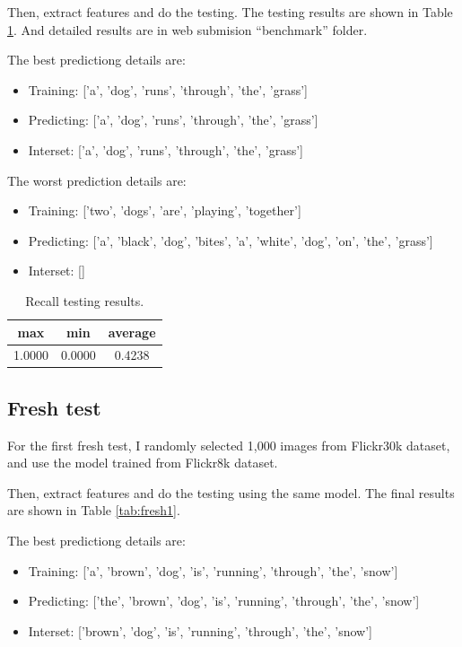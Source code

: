 \documentclass[10pt,twocolumn,letterpaper]{article}
\begin{document}
Then, extract features and do the testing. The testing results are shown in Table \ref{tab:recall}.
And detailed results are in web submision ``benchmark'' folder.

The best predictiong details are:
\begin{itemize}
    \item Training: ['a', 'dog', 'runs', 'through', 'the', 'grass']
    \item Predicting: ['a', 'dog', 'runs', 'through', 'the', 'grass']
    \item Interset: ['a', 'dog', 'runs', 'through', 'the', 'grass']
\end{itemize}

The worst prediction details are:
\begin{itemize}
    \item Training: ['two', 'dogs', 'are', 'playing', 'together']
    \item Predicting: ['a', 'black', 'dog', 'bites', 'a', 'white', 'dog', 'on', 'the', 'grass']
    \item Interset: []
\end{itemize}

\begin{table}[]
\centering
\begin{tabular}{ccc}
\hline
max    & min    & average \\ \hline
1.0000 & 0.0000 & 0.4238  \\ \hline
\end{tabular}
\caption{Recall testing results.}
\label{tab:recall}
\end{table}

\subsection{Fresh test}
For the first fresh test, I randomly selected 1,000 images from Flickr30k dataset,
and use the model trained from Flickr8k dataset.

Then, extract features and do the testing using the same model. The final results are shown in Table \ref{tab:fresh1}.

The best predictiong details are:
\begin{itemize}
    \item Training: ['a', 'brown', 'dog', 'is', 'running', 'through', 'the', 'snow']
    \item Predicting: ['the', 'brown', 'dog', 'is', 'running', 'through', 'the', 'snow']
    \item Interset: ['brown', 'dog', 'is', 'running', 'through', 'the', 'snow']
\end{itemize}
\end{document}

